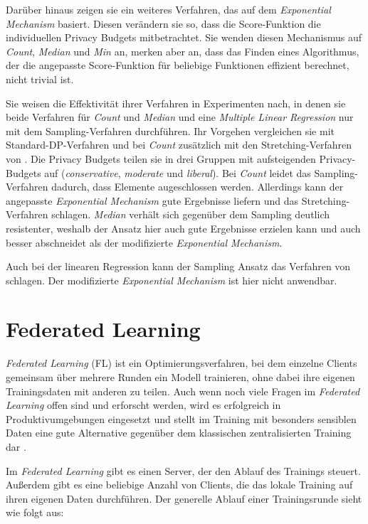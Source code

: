 Darüber hinaus zeigen sie ein weiteres Verfahren, das auf dem \textit{Exponential Mechanism} basiert. Diesen verändern sie so, dass die Score-Funktion die individuellen Privacy Budgets mitbetrachtet. Sie wenden diesen Mechanismus auf \textit{Count}, \textit{Median} und \textit{Min} an, merken aber an, dass das Finden eines Algorithmus, der die angepasste Score-Funktion für beliebige Funktionen effizient berechnet, nicht trivial ist.

Sie weisen die Effektivität ihrer Verfahren in Experimenten nach, in denen sie beide Verfahren für \textit{Count} und \textit{Median} und eine \textit{Multiple Linear Regression} nur mit dem Sampling-Verfahren durchführen. Ihr Vorgehen vergleichen sie mit Standard-DP-Verfahren und bei \textit{Count} zusätzlich mit den Stretching-Verfahren von \textcite{alaggan:2016}. Die Privacy Budgets teilen sie in drei Gruppen mit aufsteigenden Privacy-Budgets auf (\textit{conservative}, \textit{moderate} und \textit{liberal}). Bei \textit{Count} leidet das Sampling-Verfahren dadurch, dass Elemente augeschlossen werden. Allerdings kann der angepasste \textit{Exponential Mechanism} gute Ergebnisse liefern und das Stretching-Verfahren schlagen. \textit{Median} verhält sich gegenüber dem Sampling deutlich resistenter, weshalb der Ansatz hier auch gute Ergebnisse erzielen kann und auch besser abschneidet als der modifizierte \textit{Exponential Mechanism}. 

Auch bei der linearen Regression kann der Sampling Ansatz das Verfahren von \cite{alaggan:2016} schlagen. Der modifizierte \textit{Exponential Mechanism} ist hier nicht anwendbar.

\section{Federated Learning}\label{fund-fl}

\textit{Federated Learning} (FL) ist ein Optimierungsverfahren, bei dem einzelne Clients gemeinsam über mehrere Runden ein Modell trainieren, ohne dabei ihre eigenen Trainingsdaten mit anderen zu teilen. Auch wenn noch viele Fragen im \textit{Federated Learning} offen sind und erforscht werden, wird es erfolgreich in Produktivumgebungen eingesetzt und stellt im Training mit besonders sensiblen Daten eine gute Alternative gegenüber dem klassischen zentralisierten Training dar \cite{hard:2018, ramaswamy:2020}.

Im \textit{Federated Learning} gibt es einen Server, der den Ablauf des Trainings steuert. Außerdem gibt es eine beliebige Anzahl von Clients, die das lokale Training auf ihren eigenen Daten durchführen. Der generelle Ablauf einer Trainingsrunde sieht wie folgt aus: 

